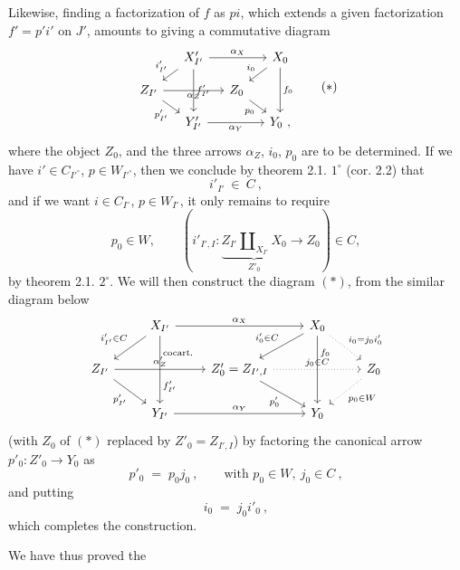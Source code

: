 \documentclass[11pt]{article}
\newcommand{\printedpage}[1]{\marginpar{\footnotesize p.~#1}}
\newcommand{\msp}[1]{\marginpar{\footnotesize [#1]}}
\begin{document}
Likewise, finding a factorization of $f$ as $pi$, which extends a given factorization $f'=p'i'$ on $J'$, amounts to giving a commutative diagram
\[
\begin{tikzcd}[column sep=small, row sep=small]
& X'_{I'} \arrow[rr, "\alpha_X"] \arrow[dl, "i'_{I'}"'] \arrow[dd, "f'_{I'}"] & & X_0 \arrow[dl, "i_0"'] \arrow[dd, "f_0"] \\
Z_{I'} \arrow[rr, "\alpha_Z"'] \arrow[dr, "p'_{I'}"'] & & Z_0 \arrow[dr, "p_0"'] & \\
& Y'_{I'} \arrow[rr, "\alpha_Y"'] & & Y_0\ ,
\end{tikzcd}
\tag*{$(*)$}
\]
\msp{48: blank}
\msp{49}
where the object $Z_0$, and the three arrows $\alpha_Z$, $i_0$, $p_0$ are to be determined. If we have $i'\in C_{I'^\circ}$, $p\in W_{I'^\circ}$, %
then we conclude by theorem 2.1. $1^\circ$ (cor. 2.2) that
\[
i'_{I'}\ \in\ C\ ,
\]
and if we want $i\in C_{I^\circ}$, $p\in W_{I^\circ}$, it only remains to require
\[
p_0\in W, \qquad (i'_{I',I}:\underbrace{Z_{I'}\amalg_{X_{I'}}X_0}_{Z'_0}\longrightarrow Z_0)\in C,
\]
by theorem 2.1. $2^\circ$. We will then construct the diagram $(*)$, from the similar diagram below
\[
\begin{tikzcd}
& X_{I'} \arrow[rr, "\alpha_X"] \arrow[dl, "i'_{I'}\in C"'] \arrow[dd, "\text{cocart.}" {pos=0.25}, "f'_{I'}" {pos=0.75}] & & X_0 \arrow[dl, "i'_0\in C"'] \arrow[dd, "f_0" {pos=0.25}] \arrow[dr, dotted, "i_0=j_0i'_0"] & \\
Z_{I'} \arrow[rr, "\alpha'_Z"] \arrow[dr, "p'_{I'}"'] & & Z'_0=Z_{I',I} \arrow[rr, dotted, "j_0\in C"] \arrow[dr, "p'_0"'] & & Z_0 \arrow[dl, dotted, "p_0\in W"] \\
& Y_{I'} \arrow[rr, "\alpha_Y"] & & Y_0 &
\end{tikzcd}
\]
(with $Z_0$ of $(*)$ replaced by $Z'_0=Z_{I',I}$) by factoring the canonical arrow $p'_0:Z'_0\longrightarrow Y_0$ as
\[
p'_0 \;=\; p_0j_0\ , \qquad \text{with } p_0\in W,\ j_0\in C\ ,
\]
and putting
\[
i_0 \;=\; j_0i'_0\ ,
\]
which completes the construction.

We have thus proved the

\printedpage{26}
\end{document}
